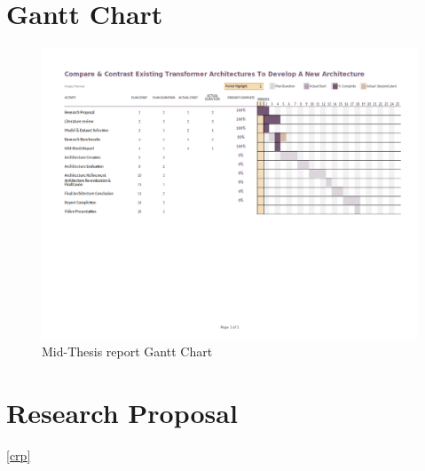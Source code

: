 \documentclass[a4paper,12pt]{report}
\begin{document}
   \begin{appendices}
    	\chapter{Gantt Chart}\label{cgc}
		    \begin{figure}[!h]
		       	\centering
		        \includegraphics[scale=0.55,angle=90]{../images/GanttChart-mid.png}
		     	\caption{Mid-Thesis report Gantt Chart}\label{ganttChartMid}
              \end{figure}
         \chapter{Research Proposal}\ref{crp}
               
    \end{appendices}

\end{document}
